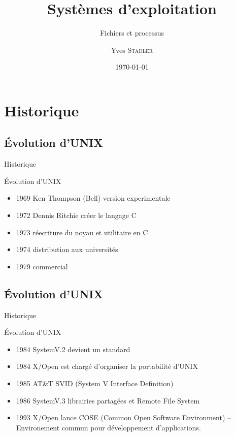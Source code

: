 
\title{Systèmes d'exploitation}
\subtitle{Fichiers et processus}

\author{Yves \textsc{Stadler}}

\date{\today}




\begin{frame}
\titlepage
\end{frame}

\def\sectitle{Historique}
\section{\sectitle}
\def\subsectitle{Évolution d'UNIX}
\subsection{\subsectitle}

\begin{frame}{\sectitle}
\begin{block}{\subsectitle}
\begin{itemize}
\item 1969 Ken Thompson (Bell) version experimentale
\item 1972 Dennis Ritchie créer le langage C
\item 1973 réecriture du noyau et utilitaire en C
\item 1974 distribution aux universités
\item 1979 commercial
\end{itemize}
\end{block}
\end{frame}

\def\subsectitle{Évolution d'UNIX}
\subsection{\subsectitle}


\begin{frame}{\sectitle}
\begin{block}{\subsectitle}
\begin{itemize}
\item 1984 SystemV.2 devient un standard
\item 1984 X/Open est chargé d'organiser la portabilité d'UNIX
\item 1985 AT\&T SVID (System V Interface Definition)
\item 1986 SystemV.3 librairies partagées et Remote File System
\item 1993 X/Open lance COSE (Common Open Software Environment) -- Environement commun pour développement d'applications.
\end{itemize}
\end{block}
\end{frame}


